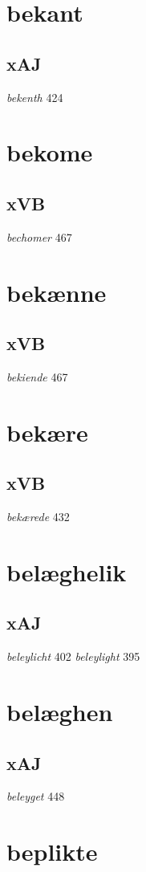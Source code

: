 \documentclass[a4paper,twocolumn]{article}
\begin{document}
\section{bekant}
\label{sec:org18752e4}
\subsection{xAJ}
\label{sec:org0120268}
\emph{bekenth} 424 
\section{bekome}
\label{sec:orgcac2dcc}
\subsection{xVB}
\label{sec:org016bd42}
\emph{bechomer} 467 
\section{bekænne}
\label{sec:orgc1ba1cc}
\subsection{xVB}
\label{sec:org77e1908}
\emph{bekiende} 467 
\section{bekære}
\label{sec:orgea29ce3}
\subsection{xVB}
\label{sec:orge4df171}
\emph{bekærede} 432 
\section{belæghelik}
\label{sec:org9a286db}
\subsection{xAJ}
\label{sec:orgd2746f2}
\emph{beleylicht} 402 \emph{beleylight} 395 
\section{belæghen}
\label{sec:orgabaf8bc}
\subsection{xAJ}
\label{sec:org0f6426f}
\emph{beleyget} 448 
\section{beplikte}
\label{sec:org5067ea4}
\end{document}
